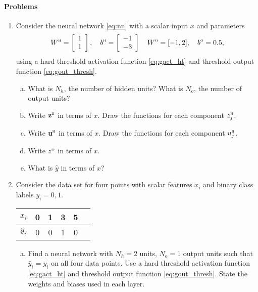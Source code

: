 \documentclass[11pt]{article}
\newcommand{\ubf}{\mathbf{u}}
\newcommand{\zbf}{\mathbf{z}}
\def\hid{\textsc{\tiny H}}
\def\out{\textsc{\tiny O}}
\begin{document}
\paragraph*{Problems}
\begin{enumerate}
\item Consider the neural network \eqref{eq:nn} with a scalar input $x$ and parameters
\[
    W^\hid = \left[ \begin{array}{c} 1 \\ 1 \end{array} \right], \quad
    b^\hid = \left[ \begin{array}{c} -1 \\ -3 \end{array} \right] \quad
    W^\out = [-1, 2], \quad b^\out = 0.5,
\]
using a hard threshold activation function \eqref{eq:gact_ht} and
threshold output function \eqref{eq:gout_thresh}.
\begin{enumerate}[(a)]
\item What is $N_h$, the number of hidden units?  What is $N_o$, the number of output units?

\item Write $\zbf^\hid$ in terms of $x$.  Draw the functions for each component $z_j^\hid$.

\item Write $\ubf^\hid$ in terms of $x$.  Draw the functions for each component $u_j^\hid$.

\item Write $z^\out$ in terms of $x$.

\item What is $\hat{y}$ in terms of $x$?
\end{enumerate}

\item Consider the data set for four points with
scalar features $x_i$ and binary class labels $y_i=0,1$.

\begin{center}
\begin{tabular}{|c|c|c|c|c|c|} \hline
$x_i$ & 0 & 1 & 3 & 5 \\ \hline
$y_i$ & 0 & 0 & 1 & 0 \\ \hline
\end{tabular}
\end{center}

\begin{enumerate}[(a)]
\item Find a neural network with $N_h=2$ units, $N_o=1$ output units
such that $\hat{y}_i=y_i$ on all four data points.
Use a hard threshold activation function \eqref{eq:gact_ht} and
threshold output function \eqref{eq:gout_thresh}.
State the weights and biases used in each layer.


\end{enumerate}
\end{enumerate}
\end{document}

